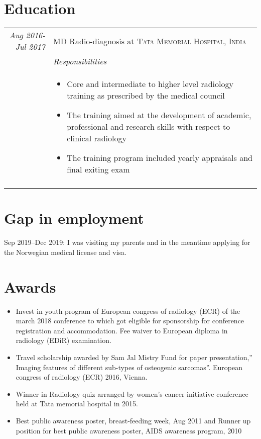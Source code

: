 \documentclass[a4paper,10pt]{article}
\begin{document}
\section{Education}

\begin{tabular}{r|p{11cm}}
\emph{Aug 2016-Jul 2017} & MD Radio-diagnosis at \textsc{Tata Memorial Hospital, India} \\
 
\textsc{}&\emph{Responsibilities}\\&\footnotesize{

\begin{itemize} 
        \vspace{-0.2cm}\item Core and intermediate to higher level radiology training as prescribed by the medical council
        \vspace{-0.2cm}\item The training aimed at the development of academic, professional and research skills with respect to clinical radiology
        \vspace{-0.2cm}\item The training program included yearly appraisals and final exiting exam
     \end{itemize}
}\\\multicolumn{2}{c}{} \\
\end{tabular}

\section{Gap in employment}
Sep 2019–Dec 2019: I was visiting my parents and in the meantime applying for the Norwegian medical license and visa.\\

\section{Awards}
\begin{itemize}
  \item Invest in youth program of European congress of radiology (ECR) of the march 2018 conference to which got eligible for sponsorship for conference registration and accommodation. Fee waiver to European diploma in radiology (EDiR) examination.
  \vspace{-0.2cm}\item Travel scholarship awarded by Sam Jal Mistry Fund for paper presentation,” Imaging features of different sub-types of osteogenic sarcomas”. European congress of radiology (ECR) 2016, Vienna.
  \vspace{-0.2cm}\item Winner in Radiology quiz arranged by women's cancer initiative conference held at Tata memorial hospital in 2015.
  \vspace{-0.2cm}\item Best public awareness poster, breast-feeding week, Aug 2011 and Runner up position for best public awareness poster, AIDS awareness program, 2010
\end{itemize}
\end{document}
